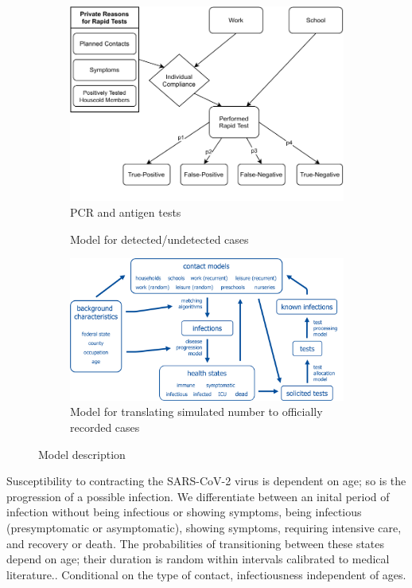 \begin{figure}[!tp]
\begin{subfigure}[b]{0.475\textwidth}
        \includegraphics[width=\textwidth]{../figures/model-graph-bottom-left}
        \caption{{\small PCR and antigen tests}}
        \label{fig:pcr_antigen_tests}
    \end{subfigure}
    \hfill
    \begin{subfigure}[b]{0.475\textwidth}
        \centering

        Model for detected/undetected cases

        \includegraphics[width=\textwidth]{../figures/model_detailed.png}
        \caption{{\small Model for translating simulated number to officially recorded cases}}
        \label{fig:model_for_official_cases}
    \end{subfigure}

    \caption{Model description}
    \label{fig:model-description}
\end{figure}

Susceptibility to contracting the SARS-CoV-2 virus is dependent on age; so is the progression of a possible infection. We differentiate between an inital period of infection without being infectious or showing symptoms, being infectious (presymptomatic or asymptomatic), showing symptoms, requiring intensive care, and recovery or death. The probabilities of transitioning between these states depend on age; their duration is random within intervals calibrated to medical literature.. Conditional on the type of contact, infectiousness independent of ages.


